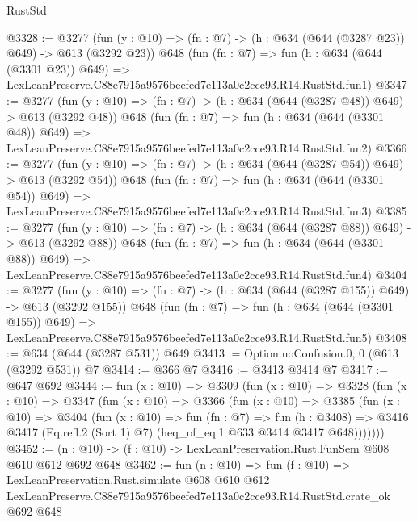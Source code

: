\begin{lexlean}{RustStd}
\begin{coremodule}
@3328 := @3277
    (fun (y : @10) => (fn : @7) -> (h : @634 (@644 (@3287 @23)) @649) -> @613 (@3292 @23))
    @648
    (fun (fn : @7) =>
    fun (h : @634 (@644 (@3301 @23)) @649) =>
    LexLeanPreserve.C88e7915a9576beefed7e113a0c2cce93.R14.RustStd.fun1)
@3347 := @3277
    (fun (y : @10) => (fn : @7) -> (h : @634 (@644 (@3287 @48)) @649) -> @613 (@3292 @48))
    @648
    (fun (fn : @7) =>
    fun (h : @634 (@644 (@3301 @48)) @649) =>
    LexLeanPreserve.C88e7915a9576beefed7e113a0c2cce93.R14.RustStd.fun2)
@3366 := @3277
    (fun (y : @10) => (fn : @7) -> (h : @634 (@644 (@3287 @54)) @649) -> @613 (@3292 @54))
    @648
    (fun (fn : @7) =>
    fun (h : @634 (@644 (@3301 @54)) @649) =>
    LexLeanPreserve.C88e7915a9576beefed7e113a0c2cce93.R14.RustStd.fun3)
@3385 := @3277
    (fun (y : @10) => (fn : @7) -> (h : @634 (@644 (@3287 @88)) @649) -> @613 (@3292 @88))
    @648
    (fun (fn : @7) =>
    fun (h : @634 (@644 (@3301 @88)) @649) =>
    LexLeanPreserve.C88e7915a9576beefed7e113a0c2cce93.R14.RustStd.fun4)
@3404 := @3277
    (fun (y : @10) => (fn : @7) -> (h : @634 (@644 (@3287 @155)) @649) -> @613 (@3292 @155))
    @648
    (fun (fn : @7) =>
    fun (h : @634 (@644 (@3301 @155)) @649) =>
    LexLeanPreserve.C88e7915a9576beefed7e113a0c2cce93.R14.RustStd.fun5)
@3408 := @634 (@644 (@3287 @531)) @649
@3413 := Option.noConfusion.{0, 0} (@613 (@3292 @531)) @7
@3414 := @366 @7
@3416 := @3413 @3414 @7
@3417 := @647 @692
@3444 := fun (x : @10) =>
  @3309
    (fun (x : @10) =>
    @3328
      (fun (x : @10) =>
      @3347
        (fun (x : @10) =>
        @3366
          (fun (x : @10) =>
          @3385
            (fun (x : @10) =>
            @3404
              (fun (x : @10) =>
              fun (fn : @7) =>
              fun (h : @3408) =>
              @3416 @3417 (Eq.refl.{2} (Sort 1) @7) (heq_of_eq.{1} @633 @3414 @3417 @648)))))))
@3452 := (n : @10) -> (f : @10) -> LexLeanPreservation.Rust.FunSem @608 @610 @612 @692 @648
@3462 := fun (n : @10) =>
  fun (f : @10) =>
  LexLeanPreservation.Rust.simulate
    @608
    @610
    @612
    LexLeanPreserve.C88e7915a9576beefed7e113a0c2cce93.R14.RustStd.crate_ok
    @692
    @648
\end{coremodule}
\end{lexlean}
